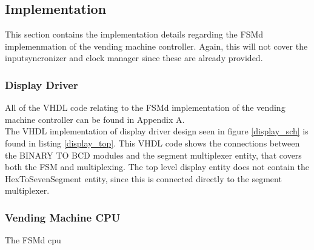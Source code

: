 \subsection{Implementation}
This section contains the implementation details regarding the FSMd implemenmation of the vending machine controller.
Again, this will not cover the inputsyncronizer and clock manager since these are already provided.

\subsubsection{Display Driver}
All of the VHDL code relating to the FSMd implementation of the vending machine controller can be found in Appendix A. \\


The VHDL implementation of display driver design seen in figure \ref{display_sch} is found in listing 
\ref{display_top}.
This VHDL code shows the connections between the BINARY TO BCD modules and the segment multiplexer entity, that covers both the FSM and multiplexing.
The top level display entity does not contain the HexToSevenSegment entity, since this is connected directly to the segment multiplexer.

\subsubsection{Vending Machine CPU}
The FSMd cpu
